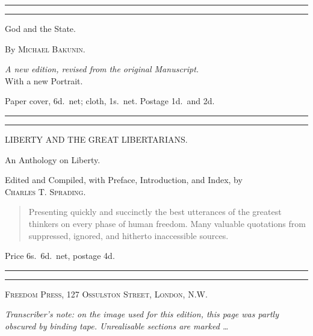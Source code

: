 \documentclass[oneside]{book}
\newcommand{\DoubleLine}{%
\medskip
\begin{center}\rule{1in}{0.5pt}\end{center}
\vspace{-6ex}
\begin{center}\rule{1in}{0.5pt}\end{center}
\medskip
}
\begin{document}
\DoubleLine


\begin{center}{\LARGE God and the State.}\end{center}
\begin{center}{By \textsc{Michael Bakunin}.}\end{center}

\begin{center}{\textit{A new edition, revised from the original Manuscript.}\\
With a new Portrait.}\end{center}

\begin{center}{Paper cover, 6d.\ net; cloth, 1s.\ net. Postage 1d.\ and 2d.}\end{center}

\DoubleLine


\begin{center}{\large LIBERTY AND THE GREAT LIBERTARIANS.}\end{center}
\begin{center}{An Anthology on Liberty.}\end{center}

\begin{center}{Edited and Compiled, with Preface, Introduction, and Index, by\\
\textsc{Charles T. Sprading}.}\end{center}

\begin{quote}
Presenting quickly and succinctly the best utterances of the greatest
thinkers on every phase of human freedom. Many valuable quotations from
suppressed, ignored, and hitherto inaccessible sources.
\end{quote}

\begin{center}{Price 6s.\ 6d.\ net, postage 4d.}\end{center}

\DoubleLine

\begin{center}{\textsc{Freedom Press, 127 Ossulston Street, London, N.W.}}\end{center}



\newpage

\textit{Transcriber's note: on the image used for this edition, this page
was partly obscured by binding tape. Unrealisable sections are marked \dots}
\end{document}
